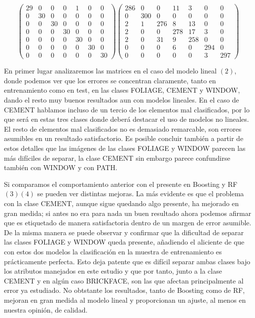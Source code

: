 \documentclass{article}
\begin{document}
	\begin{equation}
	\begin{pmatrix}
	29 & 0 & 0 & 0 & 1 & 0 & 0\\
	0 & 30 & 0 & 0 & 0 & 0 & 0\\
	0 & 0 & 30 & 0 & 0 & 0 & 0\\
	0 & 0 & 0 & 30 & 0 & 0 & 0\\
	0 & 0 & 0 & 0 & 30 & 0 & 0\\
	0 & 0 & 0 & 0 & 0 & 30 & 0\\
	0 & 0 & 0 & 0 & 0 & 0 & 30
	\end{pmatrix}
	\begin{pmatrix}
	286 & 0 & 0 & 11 & 3 & 0 & 0\\
	0 & 300 & 0 & 0 & 0 & 0 & 0\\
	2 & 1 & 276 & 8 & 13 & 0 & 0\\
	2 & 0 & 0 & 278 & 17 & 3 & 0\\
	2 & 0 & 31 & 9 & 258 & 0 & 0\\
	0 & 0 & 0 & 6 & 0 & 294 & 0\\
	0 & 0 & 0 & 0 & 0 & 3 & 297
	\end{pmatrix}
	\end{equation}
	
	En primer lugar analizaremos las matrices en el caso del modelo lineal $(2)$, donde podemos ver que los errores se concentran claramente, tanto en entrenamiento como en test, en las clases FOLIAGE, CEMENT y WINDOW, dando el resto muy buenos resultados aun con modelos lineales. En el caso de CEMENT hablamos incluso de un tercio de los elementos mal clasificados, por lo que será en estas tres clases donde deberá destacar el uso de modelos no lineales. El resto de elementos mal clasificados no es demasiado remarcable, son errores asumibles en un resultado satisfactorio. Es posible concluir también a partir de estos detalles que las imágenes de las clases FOLIAGE y WINDOW parecen las más difíciles de separar, la clase CEMENT sin embargo parece confundirse también con WINDOW y con PATH.
	\par 
	Si comparamos el comportamiento anterior con el presente en Boosting y RF $(3)(4)$ se pueden ver distintas mejoras. La más evidente es que el problema con la clase CEMENT, aunque sigue quedando algo presente, ha mejorado en gran medida; si antes no era para nada un buen resultado ahora podemos afirmar que es etiquetado de manera satisfactoria dentro de un margen de error asumible. De la misma manera se puede observar y confirmar que la dificultad de separar las clases FOLIAGE y WINDOW queda presente, añadiendo el aliciente de que con estos dos modelos la clasificación en la muestra de entrenamiento es prácticamente perfecta. Esto deja patente que es difícil separar ambas clases bajo los atributos manejados en este estudio y que por tanto, junto a la clase CEMENT y en algún caso BRICKFACE, son las que afectan principalmente al error ya estudiado. No obtstante los resultados, tanto de Boosting como de RF, mejoran en gran medida al modelo lineal y proporcionan un ajuste, al menos en nuestra opinión, de calidad.
	
\end{document}
